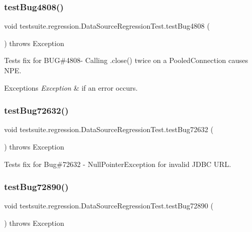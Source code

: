 \subsubsection{\texorpdfstring{test\+Bug4808()}{testBug4808()}}
{\footnotesize\ttfamily void testsuite.\+regression.\+Data\+Source\+Regression\+Test.\+test\+Bug4808 (\begin{DoxyParamCaption}{ }\end{DoxyParamCaption}) throws Exception}

Tests fix for B\+UG\#4808-\/ Calling .close() twice on a Pooled\+Connection causes N\+PE.


\begin{DoxyExceptions}{Exceptions}
{\em Exception} & if an error occurs. \\
\hline
\end{DoxyExceptions}
\mbox{\label{classtestsuite_1_1regression_1_1_data_source_regression_test_abba082ff766209732ff52f20bfe77cae}} 
\subsubsection{\texorpdfstring{test\+Bug72632()}{testBug72632()}}
{\footnotesize\ttfamily void testsuite.\+regression.\+Data\+Source\+Regression\+Test.\+test\+Bug72632 (\begin{DoxyParamCaption}{ }\end{DoxyParamCaption}) throws Exception}

Tests fix for Bug\#72632 -\/ Null\+Pointer\+Exception for invalid J\+D\+BC U\+RL. \mbox{\label{classtestsuite_1_1regression_1_1_data_source_regression_test_ae91b4203179883e6c257ba0484c9974e}} 
\subsubsection{\texorpdfstring{test\+Bug72890()}{testBug72890()}}
{\footnotesize\ttfamily void testsuite.\+regression.\+Data\+Source\+Regression\+Test.\+test\+Bug72890 (\begin{DoxyParamCaption}{ }\end{DoxyParamCaption}) throws Exception}

